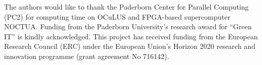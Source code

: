 \documentclass[format=acmsmall,review,timestamp,urlbreakonhyphens]{acmart}
\begin{document}

\begin{acks}
The authors would like to thank the Paderborn Center for Parallel Computing (PC2) for computing time on OCuLUS and FPGA-based supercomputer NOCTUA. Funding from the Paderborn University's research award for ``Green IT'' is kindly acknowledged. This project has received funding from the European Research Council (ERC) under the European Union's Horizon 2020 research and innovation programme (grant agreement No 716142).
\end{acks}



\end{document}
